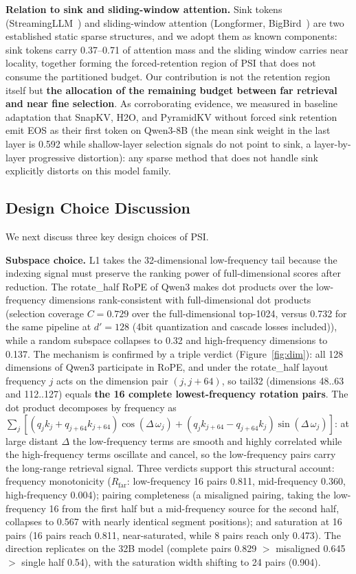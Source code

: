 \documentclass[11pt]{article}
\begin{document}
\textbf{Relation to sink and sliding-window attention.} Sink tokens (StreamingLLM~\cite{streamingllm}) and sliding-window attention (Longformer, BigBird~\cite{longformer,bigbird}) are two established static sparse structures, and we adopt them as known components: sink tokens carry 0.37--0.71 of attention mass and the sliding window carries near locality, together forming the forced-retention region of PSI that does not consume the partitioned budget. Our contribution is not the retention region itself but \textbf{the allocation of the remaining budget between far retrieval and near fine selection}. As corroborating evidence, we measured in baseline adaptation that SnapKV, H2O, and PyramidKV without forced sink retention emit EOS as their first token on Qwen3-8B (the mean sink weight in the last layer is 0.592 while shallow-layer selection signals do not point to sink, a layer-by-layer progressive distortion): any sparse method that does not handle sink explicitly distorts on this model family.

\subsection{Design Choice Discussion}

We next discuss three key design choices of PSI.

\textbf{Subspace choice.} L1 takes the 32-dimensional low-frequency tail because the indexing signal must preserve the ranking power of full-dimensional scores after reduction. The rotate\_half RoPE of Qwen3 makes dot products over the low-frequency dimensions rank-consistent with full-dimensional dot products (selection coverage $C{=}0.729$ over the full-dimensional top-1024, versus 0.732 for the same pipeline at $d'{=}128$ (4bit quantization and cascade losses included)), while a random subspace collapses to 0.32 and high-frequency dimensions to 0.137. The mechanism is confirmed by a triple verdict (Figure~\ref{fig:dim}): all 128 dimensions of Qwen3 participate in RoPE, and under the rotate\_half layout frequency $j$ acts on the dimension pair $(j, j{+}64)$, so tail32 (dimensions 48..63 and 112..127) equals \textbf{the 16 complete lowest-frequency rotation pairs}. The dot product decomposes by frequency as $\sum_j [(q_j k_j + q_{j+64} k_{j+64})\cos(\Delta\,\omega_j) + (q_j k_{j+64} - q_{j+64} k_j)\sin(\Delta\,\omega_j)]$: at large distant $\Delta$ the low-frequency terms are smooth and highly correlated while the high-frequency terms oscillate and cancel, so the low-frequency pairs carry the long-range retrieval signal. Three verdicts support this structural account: frequency monotonicity ($R_{\mathrm{far}}$: low-frequency 16 pairs 0.811, mid-frequency 0.360, high-frequency 0.004); pairing completeness (a misaligned pairing, taking the low-frequency 16 from the first half but a mid-frequency source for the second half, collapses to 0.567 with nearly identical segment positions); and saturation at 16 pairs (16 pairs reach 0.811, near-saturated, while 8 pairs reach only 0.473). The direction replicates on the 32B model (complete pairs 0.829 $>$ misaligned 0.645 $>$ single half 0.54), with the saturation width shifting to 24 pairs (0.904).
\end{document}
